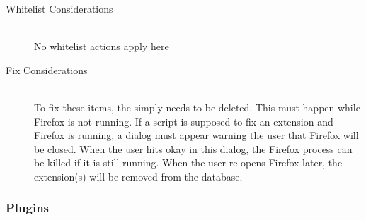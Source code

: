 \begin{description}
\item[Whitelist Considerations] \hfill \\
No whitelist actions apply here
\item[Fix Considerations] \hfill \\
To fix these items, the  simply needs to be deleted.  This must
happen while Firefox is not running.  If a script is supposed to fix an
extension and Firefox is running, a dialog must appear warning the user that
Firefox will be closed.  When the user hits okay in this dialog, the Firefox
process can be killed if it is still running.  When the user re-opens Firefox
later, the extension(s) will be removed from the database.
\end{description}

\subsubsection{Plugins}
